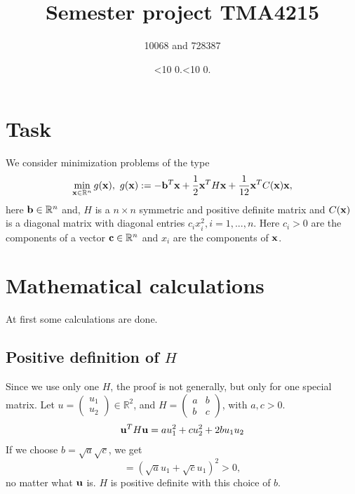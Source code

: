 \documentclass[a4paper,12pt]{article}
\newcommand{\leadingzero}[1]{\ifnum #1<10 0\the#1\else\the#1\fi}
\newcommand{\mytoday}{\leadingzero{\day}.\leadingzero{\month}.\the\year}
\begin{document}
\title{Semester project TMA4215}
\author{10068 and 728387}
\date{\mytoday}
\maketitle


\section{Task}
We consider minimization problems of the type
\begin{align*}
\min_{{\bf x} \in \mathbb{R}^n} g({\bf x}),\,\, g({\bf x}):=-{\bf b}^T{\bf x} + \frac12{\bf x}^TH{\bf x}+\frac1{12}{\bf x}^TC({\bf x}){\bf x},
\end{align*}
here ${\bf b} \in \mathbb{R}^n$ and, $H$ is a $n \times n$ symmetric and positive definite matrix and $C(\bf{x})$ is a diagonal
matrix with diagonal entries $c_i x^2_i, i = 1, . . . , n$. 
Here $c_i > 0$ are the components of a vector ${\bf c} \in \mathbb{R}^n$ 
and $x_i$ are the components of $\bf{x}$. 

\section{Mathematical calculations}
At first some calculations are done.
\subsection{Positive definition of $H$}
Since we use only one $H$, the proof is not generally, but only for one special matrix.
Let $u=\begin{pmatrix}u_1\\u_2\end{pmatrix}\in \mathbb{R}^2$, and $H= \begin{pmatrix} a&b\\b&c\end{pmatrix}$, with $a,c>0$.
\begin{align*}
{\bf u}^TH{\bf u} = au_1^2 + cu_2^2 + 2 b u_1u_2
\end{align*}
If we choose $b = \sqrt{a}\sqrt{c}$, we get
$$ = (\sqrt{a}u_1+\sqrt{c}u_1)^2 >0,$$
no matter what ${\bf u}$ is. 
$H$ is positive definite with this choice of $b$.
\end{document}
